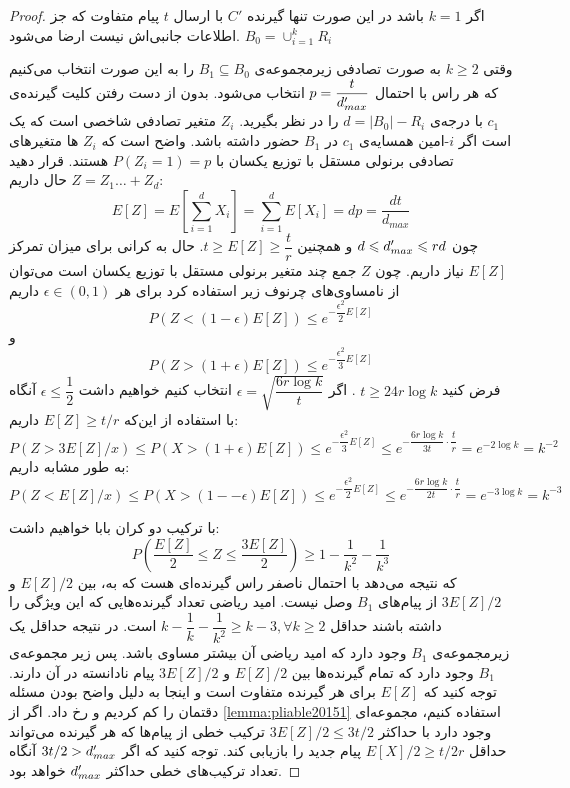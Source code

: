 \begin{proof}
	اگر
	$k = 1$
	باشد در این صورت تنها گیرنده
	$C'$
	با ارسال
	$t$
	پیام متفاوت که جز اطلاعات جانبی‌اش نیست ارضا می‌شود.
	$B_0 = \cup_{i = 1}^{k} R_i$
	
	وقتی
	$k \geq 2$
	به صورت تصادفی زیرمجموعه‌ی
	$B_1 \subseteq B_0$
	را به این صورت انتخاب می‌کنیم که هر راس با احتمال
	$p = \dfrac{t}{d_{max}'}$
	انتخاب می‌شود. بدون از دست رفتن کلیت گیرنده‌ی
	$c_1$
	با درجه‌ی
	$d = |B_0| - R_i$
	را در نظر بگیرید.
	$Z_i$
	متغیر تصادفی شاخصی است که یک است اگر
	$i$-امین همسایه‌ی
	$c_1$
	در
	$B_1$
	حضور داشته باشد. واضح است که
	$Z_i$
	ها متغیرهای تصادفی برنولی مستقل با توزیع یکسان با
	$P(Z_i = 1) = p$
	هستند. قرار دهید
	$Z = Z_1 \ldots + Z_d$
	حال داریم:
	\begin{equation}
		E[Z] = E[\sum\limits_{i = 1}^{d} X_i ] = \sum\limits_{i = 1}^{d} E[X_i] = dp = \dfrac{dt}{d_{max}}
	\end{equation}
	چون
	$d \leqslant d_{max}' \leqslant rd$
	و همچنین
	$t \geq E[Z] \geq \dfrac{t}{r}$.
	حال به کرانی برای میزان تمرکز
	$E[Z]$
	نیاز داریم. چون
	$Z$
	جمع چند متغیر برنولی مستقل با توزیع یکسان است می‌توان از نامساوی‌های چرنوف زیر استفاده کرد
	\cite{Dubhashi_Panconesi_2009}
	برای هر
	$\epsilon \in (0, 1)$
	داریم
	$$P(Z < (1 - \epsilon) E[Z]) \leq e^{- \dfrac{\epsilon^2}{2} E[Z]}$$
	و
	$$P(Z > (1 + \epsilon) E[Z]) \leq e^{- \dfrac{\epsilon^2}{3} E[Z]}$$
	فرض کنید
	$t \geq 24 r \log k$
	. اگر
	$\epsilon = \sqrt{\dfrac{6r \log k}{t}}$
	انتخاب کنیم خواهیم داشت
	$\epsilon \leq \dfrac{1}{2}$
	آنگاه با استفاده از این‌که
	$E[Z] \geq t/r$
	داریم:
	\begin{equation}
		P(Z > 3 E[Z]/x) \leq P(X > (1 + \epsilon) E[Z]) \leq e^{-\dfrac{\epsilon^2}{3} E[Z]} \leq e^{- \dfrac{6 r \log k}{3 t} \cdot \dfrac{t}{r}} = e^{- 2 \log k} = k^{-2}
	\end{equation}
	به طور مشابه داریم:
	\begin{equation}
		P(Z < E[Z]/x) \leq P(X > (1 -- \epsilon) E[Z]) \leq e^{-\dfrac{\epsilon^2}{2} E[Z]} \leq e^{- \dfrac{6 r \log k}{2 t} \cdot \dfrac{t}{r}} = e^{-3 \log k} = k^{-3}
	\end{equation}
	
	با ترکیب دو کران بابا خواهیم داشت:
	\begin{equation}
		P(\dfrac{E[Z]}{2} \leq Z \leq \dfrac{3E[Z]}{2}) \geq 1 - \dfrac{1}{k^2} - \dfrac{1}{k^3}
	\end{equation}
	که نتیجه می‌دهد با احتمال ناصفر راس گیرنده‌ای هست که به، بین
	$E[Z]/2$
	و
	$3E[Z]/2$
	از پیام‌های
	$B_1$
	وصل نیست. امید ریاضی تعداد گیرنده‌هایی که این ویژگی را داشته باشند حداقل
	$k - \dfrac{1}{k} - \dfrac{1}{k^2} \geq k - 3, \forall k \geq 2$
	است. در نتیجه حداقل یک زیرمجموعه‌ی
	$B_1$
	وجود دارد که امید ریاضی آن بیشتر مساوی باشد. پس زیر مجموعه‌ی
	$B_1$
	وجود دارد که تمام گیرنده‌ها بین
	$E[Z] / 2$
	و
	$3E[Z]/2$
	پیام نادانسته در آن دارند. توجه کنید که
	$E[Z]$
	برای هر گیرنده متفاوت است و اینجا به دلیل واضح بودن مسئله دقتمان را کم کردیم و
	رخ داد. اگر از 
	\autoref{lemma:pliable20151}
	استفاده کنیم، مجموعه‌ای وجود دارد با حداکثر
	$3E[Z]/2 \leq 3t/2$
	ترکیب خطی از پیام‌ها که هر گیرنده می‌تواند حداقل
	$E[X]/2 \geq t/2r$
	پیام جدید را بازیابی کند. توجه کنید که اگر
	$3t/2 > d_{max}'$
	آنگاه تعداد ترکیب‌های خطی حداکثر
	$d_{max}'$
	خواهد بود.
	

\end{proof}
